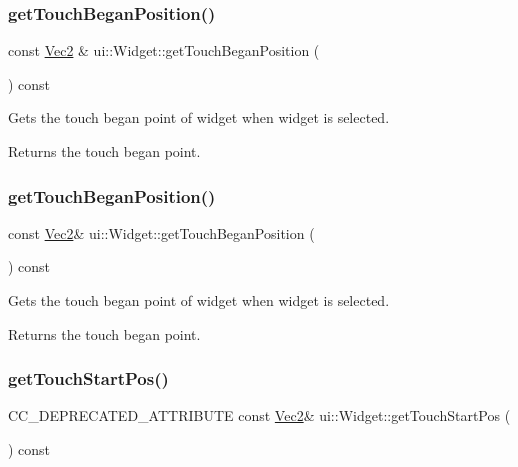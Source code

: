 \subsubsection{\texorpdfstring{get\+Touch\+Began\+Position()}{getTouchBeganPosition()}\hspace{0.1cm}{\footnotesize\ttfamily [1/2]}}
{\footnotesize\ttfamily const \hyperlink{classVec2}{Vec2} \& ui\+::\+Widget\+::get\+Touch\+Began\+Position (\begin{DoxyParamCaption}{ }\end{DoxyParamCaption}) const}

Gets the touch began point of widget when widget is selected. \begin{DoxyReturn}{Returns}
the touch began point. 
\end{DoxyReturn}
\mbox{\label{classui_1_1Widget_a713f9728086cf5bff220dcafe4f47d38}} 
\subsubsection{\texorpdfstring{get\+Touch\+Began\+Position()}{getTouchBeganPosition()}\hspace{0.1cm}{\footnotesize\ttfamily [2/2]}}
{\footnotesize\ttfamily const \hyperlink{classVec2}{Vec2}\& ui\+::\+Widget\+::get\+Touch\+Began\+Position (\begin{DoxyParamCaption}{ }\end{DoxyParamCaption}) const}

Gets the touch began point of widget when widget is selected. \begin{DoxyReturn}{Returns}
the touch began point. 
\end{DoxyReturn}
\mbox{\label{classui_1_1Widget_a6b930ace2f89e8fe077836d49701fda3}} 
\subsubsection{\texorpdfstring{get\+Touch\+Start\+Pos()}{getTouchStartPos()}\hspace{0.1cm}{\footnotesize\ttfamily [1/2]}}
{\footnotesize\ttfamily C\+C\+\_\+\+D\+E\+P\+R\+E\+C\+A\+T\+E\+D\+\_\+\+A\+T\+T\+R\+I\+B\+U\+TE const \hyperlink{classVec2}{Vec2}\& ui\+::\+Widget\+::get\+Touch\+Start\+Pos (\begin{DoxyParamCaption}{ }\end{DoxyParamCaption}) const\hspace{0.3cm}{\ttfamily [inline]}}

